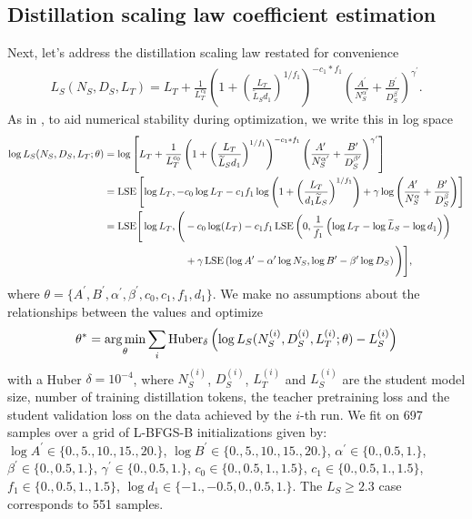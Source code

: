 \subsection{Distillation scaling law coefficient estimation}
\label{ssec:distillation-scaling-law-coefficient-estimation}

Next, let's address the distillation scaling law  restated for convenience
\begin{align}
	L_S(N_S,D_S,L_T)
	=L_T+
	\frac1{L_T^{c_0}}
	\left(1+\left(\frac{L_T}{\widetilde{L}_S d_1}\right)^{1/{f_1}}\right)^{-c_1*f_1}
	\left(\frac{A^\prime}{N_S^{\alpha^\prime}}+\frac{B^\prime}{D_S^{\beta^\prime}}\right)^{\gamma^\prime}.
\end{align}
As in ,
to aid numerical stability during optimization, we write this in log space
\begin{align}
	\log L_S(N_S,D_S,L_T;\theta) & =
	\log\left[L_T+
	\frac1{L_T^{c_0}}
	\left(1+\left(\frac{L_T}{\widetilde{L}_S d_1}\right)^{1/{f_1}}\right)^{-c_1*f_1}
	\left(\frac{A^\prime}{N_S^{\alpha^\prime}}+\frac{B^\prime}{D_S^{\beta^\prime}}\right)^{\gamma^\prime}\right]
	\\
	                             & =\mathrm{LSE}
	\left[
		\log L_T,
		-c_0 \log L_T
		-c_1f_1\log\left(1+\left(\frac{L_T}{d_1\widetilde{L}_S}\right)^{1/f_1}\right)
		+\gamma\log\left(\frac {A^\prime}{N_S^\alpha}+\frac {B^\prime}{D_S^\beta}\right)
		\right]
	\\
	                             & =\mathrm{LSE}
	\Bigg[
	\log L_T,
	\Bigg(
	-c_0 \log(L_T)
	-c_1f_1\,\mathrm{LSE}\left(0 , \frac1{f_1}\left(\log L_T - \log \widetilde{L}_S -\log d_1\right) \right)\nonumber \\
	                             & \hspace{2.8cm}+\gamma\,\mathrm{LSE}\left(
	\log A^\prime - \alpha^\prime \log N_S, \log B^\prime - \beta^\prime \log D_S\right)\Bigg)
	\Bigg],
\end{align}
where $\theta = \{A^\prime,B^\prime,\alpha^\prime,\beta^\prime,c_0,c_1,f_1,d_1\}$.
We make no assumptions about the relationships between the values
and optimize
\begin{align}
	\theta^* = \operatorname*{arg\,min}_{\theta}\sum_i\mathrm{Huber}_\delta\left(\log L_S(N_S^{(i)},D_S^{(i)},L_T^{(i)};\theta)-L_S^{(i)}\right)
\end{align}
with a Huber $\delta=10^{-4}$,
where $N_S^{(i)}$, $D_S^{(i)}$, $L_T^{(i)}$ and $L_S^{(i)}$ are the student model size, number of training distillation tokens, the teacher pretraining loss and the student validation loss on the data achieved by the $i$-th run.
We fit on 697 samples over a grid of L-BFGS-B initializations given by:
$\log A^\prime\in\{0., 5., 10., 15., 20.\}$,
$\log B^\prime\in\{0., 5., 10., 15., 20.\}$,
$\alpha^\prime\in\{0., 0.5, 1.\}$,
$\beta^\prime\in\{0., 0.5, 1.\}$,
$\gamma^\prime\in\{0., 0.5, 1.\}$,
$c_0\in\{0., 0.5, 1., 1.5\}$,
$c_1\in\{0., 0.5, 1., 1.5\}$,
$f_1\in\{0., 0.5, 1., 1.5\}$,
$\log d_1\in\{-1., -0.5, 0., 0.5, 1.\}$.
The $L_S\geq 2.3$ case corresponds to 551 samples.

